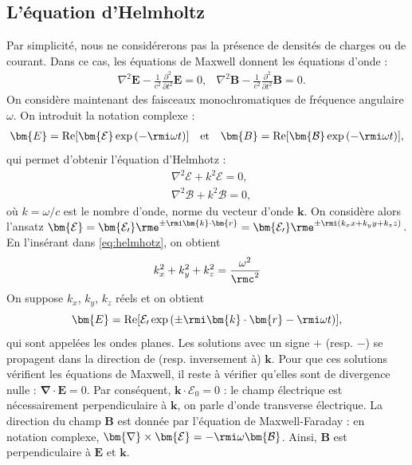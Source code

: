 \subsection{L'équation d'Helmholtz}
Par simplicité, nous ne considérerons pas la présence de densités de charges ou de courant. Dans ce cas, les équations de Maxwell donnent les équations d'onde :
\begin{align*}
&\nabla^2\bm{E}-\frac{1}{c^2}\frac{\partial^2}{\partial t^2}\bm{E}=0,
&\nabla^2\bm{B}-\frac{1}{c^2}\frac{\partial^2}{\partial t^2}\bm{B}=0.
\end{align*}
On considère maintenant des faisceaux monochromatiques de fréquence angulaire $\omega$. On introduit la notation complexe :
\begin{equation*}
\begin{split}
\bm{E}=\text{Re}[\bm{\mathcal{E}}\exp{(-\rmi\omega t)}]
\end{split}
\quad\text{et}\quad
\begin{split}
\bm{B}=\text{Re}[\bm{\mathcal{B}}\exp{(-\rmi\omega t)}],
\end{split}
\end{equation*}
qui permet d'obtenir l'équation d'Helmhotz :
\begin{align}
&\nabla^2\bm{\mathcal{E}}+k^2\bm{\mathcal{E}}=0,\nonumber\\
&\nabla^2\bm{\mathcal{B}}+k^2\bm{\mathcal{B}}=0,
\label{eq:helmhotz}
\end{align}
où $k=\omega/c$ est le nombre d'onde, norme du vecteur d'onde $\bm{k}$. On considère alors l'ansatz $\bm{\mathcal{E}}=\bm{\mathcal{E_0}}\rme^{\pm\rmi\bm{k}\cdot\bm{r}} = \bm{\mathcal{E_0}}\rme^{\pm\rmi(k_x x + k_y y + k_z z)}$. En l'insérant dans \ref{eq:helmhotz}, on obtient 
\begin{equation*}
k_x^2+k_y^2+k_z^2=\frac{\omega^2}{\rmc^2}
\end{equation*}
On suppose $k_x$, $k_y$, $k_z$ réels et on obtient 
\begin{equation*}
\bm{E}=\text{Re}[\mathcal{E_0}\exp{(\pm\rmi\bm{k}\cdot\bm{r}-\rmi\omega t)}],
\end{equation*}
qui sont appelées les ondes planes. Les solutions avec un signe $+$ (resp. $-$) se propagent dans la direction de (resp. inversement à) $\bm{k}$. Pour que ces solutions vérifient les équations de Maxwell, il reste à vérifier qu'elles sont de divergence nulle : $\bm{\nabla}\cdot\bm{E} = 0$. Par conséquent, $\bm{k}\cdot\bm{\mathcal{E_0}}= 0$ : le champ électrique est nécessairement perpendiculaire à $\bm{k}$, on parle d'onde transverse électrique. La direction du champ $\bm{B}$ est donnée par l'équation de Maxwell-Faraday : en notation complexe, $\bm{\nabla}\times\bm{\mathcal{E}}=-\rmi\omega\bm{\mathcal{B}}$. Ainsi, $\bm{B}$ est perpendiculaire à $\bm{E}$ et $\bm{k}$.

